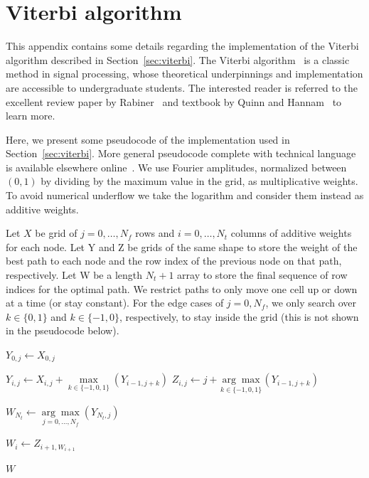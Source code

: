 \documentclass[paper-main.tex]{subfiles}
\begin{document}
\section{Viterbi algorithm}
\label{app:viterbi}

This appendix contains some details regarding the implementation of the Viterbi algorithm described in Section~\ref{sec:viterbi}. 
The Viterbi algorithm~\cite{Viterbi:1967} is a classic method in signal processing, whose theoretical underpinnings and implementation are accessible to undergraduate students. 
The interested reader is referred to the excellent review paper by Rabiner~\cite{Rabiner:1989} and textbook by Quinn and Hannam~\cite{QuinnEtAl:2001} to learn more. 

Here, we present some pseudocode of the implementation used in Section~\ref{sec:viterbi}. More general pseudocode complete with technical language is available elsewhere online~\cite{viterbipseudocode:online}. We use Fourier amplitudes, normalized between $(0, 1)$ by dividing by the maximum value in the grid, as multiplicative weights. To avoid numerical underflow we take the logarithm and consider them instead as additive weights.

Let $X$ be grid of $j=0,\ldots,N_f$ rows and $i=0,\ldots,N_t$ columns of additive weights for each node. Let Y and Z be grids of the same shape to store the weight of the best path to each node and the row index of the previous node on that path, respectively. Let W be a length $N_t+1$ array to store the final sequence of row indices for the optimal path. We restrict paths to only move one cell up or down at a time (or stay constant). For the edge cases of $j=0,N_f$, we only search over $k \in \{0,1\}$ and $k \in \{-1,0\}$, respectively, to stay inside the grid (this is not shown in the pseudocode below).

\begin{algorithmic}

		\State $Y_{0,j} \gets X_{0,j}$
    \EndFor

		
	    	\State $Y_{i,j} \gets X_{i,j} + \underset{k \in \{-1,0,1\}}{\max} (Y_{i-1,j+k})$
	    	\State $Z_{i,j} \gets j + \underset{k \in \{-1,0,1\}}{\arg\max} (Y_{i-1,j+k})$
   
	    \EndFor
    \EndFor

    \State $W_{N_t} \gets \underset{j=0,\ldots,N_f}{\arg\max} (Y_{N_t,j})$


		\State $W_i \gets Z_{i+1, W_{i+1}}$

    \EndFor    

    \State \Return $W$
\EndFunction
\end{algorithmic}
\end{document}
